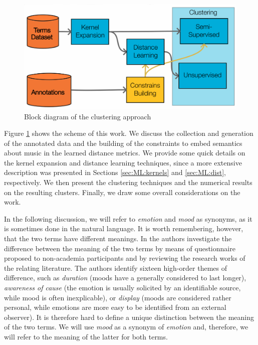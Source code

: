  \begin{figure}[tb] 
  \centering 
  \includegraphics[width=0.95\columnwidth]{img/ANEW/scheme4.pdf}
  \caption{Block diagram of the clustering approach}
  \label{fig:ANEWblockdiag}
 \end{figure} 

Figure \ref{fig:ANEWblockdiag} shows the scheme of this work. We discuss the collection and generation of the annotated data and the building of the constraints to embed semantics about music in the learned distance metrics. We provide some quick details on the kernel expansion and distance learning techniques, since a more extensive description was presented in Sections \ref{sec:ML:kernels} and \ref{sec:ML:dist}, respectively. We then present the clustering techniques and the numerical results on the resulting clusters. Finally, we draw some overall considerations on the work.
%

In the following discussion, we will refer to \textit{emotion} and \textit{mood} as synonyms, as it is sometimes done in the natural language. It is worth remembering, however, that the two terms have different meanings. In \cite{Beedie2005} the authors investigate the difference between the meaning of the two terms by means of questionnaire proposed to non-academia participants and by reviewing the research works of the relating literature. The authors identify sixteen high-order themes of difference, such as \textit{duration} (moods have a generally considered to last longer),  \textit{awareness of cause} (the emotion is usually solicited by an identifiable source, while mood is often inexplicable), or \textit{display} (moods are considered rather personal, while emotions are more easy to be identified from an external observer). It is therefore hard to define a unique distinction between the meaning of the two terms. We will use \textit{mood} as a synonym of \textit{emotion} and, therefore, we will refer to the meaning of the latter for both terms.

